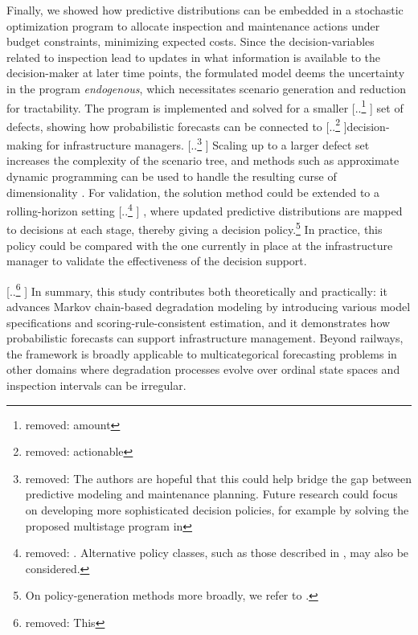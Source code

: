 \documentclass{article}
\providecommand{\DIFadd}[1]{{\protect\color{blue} \sf #1}} %
\providecommand{\DIFdel}[1]{{\protect\color{red} [..\footnote{removed: #1} ]}} %
\providecommand{\DIFaddbegin}{} %
\providecommand{\DIFaddend}{} %
\providecommand{\DIFdelbegin}{} %
\providecommand{\DIFdelend}{} %
\begin{document}
Finally, we showed how predictive distributions can be embedded in a stochastic optimization program to allocate inspection and maintenance actions under budget constraints, minimizing expected costs. 
Since the decision-variables related to inspection lead to updates in what information is available to the decision-maker at later time points, the formulated model deems the uncertainty in the program \textit{endogenous}, which necessitates scenario generation and reduction for tractability.
The program is implemented and solved for a smaller \DIFdelbegin \DIFdel{amount }\DIFdelend \DIFaddbegin \DIFadd{set }\DIFaddend of defects, showing how probabilistic forecasts can be connected to \DIFdelbegin \DIFdel{actionable }\DIFdelend decision-making for infrastructure managers. \DIFdelbegin \DIFdel{The authors are hopeful that this could help bridge the gap between predictive modeling and maintenance planning. Future research could focus on developing more sophisticated decision policies, for example by solving the proposed multistage program in }\DIFdelend \DIFaddbegin \DIFadd{Scaling up to a larger defect set increases the complexity of the scenario tree, and methods such as approximate dynamic programming can be used to handle the resulting curse of dimensionality \citep{powell2016a}. For validation, the solution method could be extended to }\DIFaddend a rolling-horizon setting\DIFdelbegin \DIFdel{. Alternative policy classes, such as those described in \citet{powell2018a}, may also be considered.
}\DIFdelend \DIFaddbegin \DIFadd{, where updated predictive distributions are mapped to decisions at each stage, thereby giving a decision policy.}\footnote{\DIFadd{On policy-generation methods more broadly, we refer to \citet{powell2018a}.}} \DIFadd{In practice, this policy could be compared with the one currently in place at the infrastructure manager to validate the effectiveness of the decision support.
}\DIFaddend 

\DIFdelbegin \DIFdel{This }\DIFdelend \DIFaddbegin \DIFadd{In summary, this }\DIFaddend study contributes both theoretically and practically: it advances Markov chain-based degradation modeling by introducing various model specifications and scoring-rule-consistent estimation, and it demonstrates how probabilistic forecasts can support infrastructure management. Beyond railways, the framework is broadly applicable to multicategorical forecasting problems in other domains where degradation processes evolve over ordinal state spaces and inspection intervals can be irregular.
\end{document}
